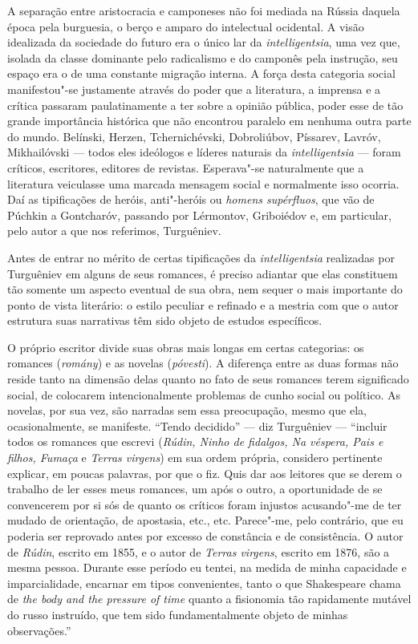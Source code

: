 A separação entre aristocracia e camponeses não foi mediada na Rússia
daquela época pela burguesia, o berço e amparo do intelectual ocidental. A
visão idealizada da sociedade do futuro era o único lar da \emph{intelligentsia}, uma vez que,
isolada da classe dominante pelo radicalismo e do
camponês pela instrução, seu espaço era o de uma constante migração interna. A força desta categoria social manifestou"-se justamente através do poder que a literatura, a imprensa e a crítica passaram paulatinamente a ter sobre a opinião pública, poder esse de tão grande importância histórica que não encontrou paralelo em nenhuma outra parte do mundo. Belínski, Herzen, Tchernichévski, Dobroliúbov, Píssarev, Lavróv, Mikhailóvski --- todos eles ideólogos e líderes naturais da \emph{intelligentsia} --- foram críticos, escritores,
editores de revistas. Esperava"-se naturalmente que a literatura
veiculasse uma marcada mensagem social e normalmente isso ocorria. Daí as tipificações de heróis, anti"-heróis ou \emph{homens supérfluos}, que vão de Púchkin a Gontcharóv, passando por Lérmontov, Griboiédov e, em particular, pelo autor a que nos referimos, Turguêniev.

Antes de entrar no mérito de certas tipificações da \emph{intelligentsia}
realizadas por Turguêniev em alguns de seus romances, é preciso adiantar
que elas constituem tão somente um aspecto eventual de sua obra, nem sequer o mais importante
do ponto de vista literário: o estilo
peculiar e refinado e a mestria com que o autor estrutura suas
narrativas têm sido objeto de estudos específicos.

O próprio escritor divide suas obras mais longas em certas categorias:
os romances (\emph{romány}) e as novelas (\emph{póvesti}). A diferença entre
as duas formas não reside tanto na dimensão delas quanto no fato de
seus romances terem significado social, de colocarem intencionalmente
problemas de cunho social ou político. As novelas, por sua vez, são
narradas sem essa preocupação, mesmo que ela, ocasionalmente, se
manifeste. ``Tendo decidido'' --- diz Turguêniev --- ``incluir todos os
romances que escrevi (\emph{Rúdin, Ninho de fidalgos, Na véspera, Pais e
filhos, Fumaça} e \emph{Terras virgens}) em sua ordem própria, considero
pertinente explicar, em poucas palavras, por que o fiz. Quis dar aos
leitores que se derem o trabalho de ler esses meus romances, um após o
outro, a oportunidade de se convencerem por si sós de quanto os críticos
foram injustos acusando"-me de ter mudado de orientação, de apostasia,
etc., etc. Parece"-me, pelo contrário, que eu poderia ser reprovado antes
por excesso de constância e de consistência. O autor de \emph{Rúdin},
escrito em 1855, e o autor de \emph{Terras virgens}, escrito em 1876,
são a mesma pessoa. Durante esse período eu tentei, na medida de minha
capacidade e imparcialidade, encarnar em tipos convenientes, tanto
o que Shakespeare chama de \emph{the body and the pressure of time}
quanto a fisionomia tão rapidamente mutável do russo instruído, que tem
sido fundamentalmente objeto de minhas observações.''


